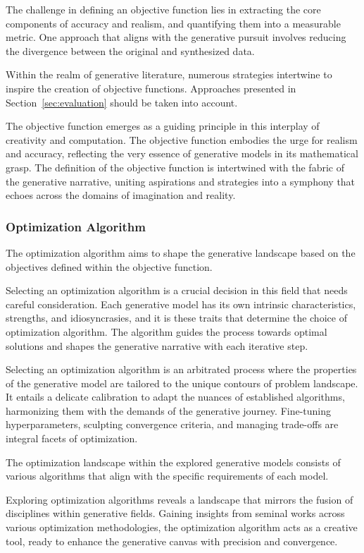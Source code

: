 The challenge in defining an objective function lies in extracting the core components of accuracy and realism, and quantifying them into a measurable metric. One approach that aligns with the generative pursuit involves reducing the divergence between the original and synthesized data.

Within the realm of generative literature, numerous strategies intertwine to inspire the creation of objective functions. Approaches presented in Section~\ref{sec:evaluation} should be taken into account.

The objective function emerges as a guiding principle in this interplay of creativity and computation. The objective function embodies the urge for realism and accuracy, reflecting the very essence of generative models in its mathematical grasp. The definition of the objective function is intertwined with the fabric of the generative narrative, uniting aspirations and strategies into a symphony that echoes across the domains of imagination and reality.

\subsubsection{Optimization Algorithm}

The optimization algorithm aims to shape the generative landscape based on the objectives defined within the objective function.

Selecting an optimization algorithm is a crucial decision in this field that needs careful consideration. Each generative model has its own intrinsic characteristics, strengths, and idiosyncrasies, and it is these traits that determine the choice of optimization algorithm. The algorithm guides the process towards optimal solutions and shapes the generative narrative with each iterative step.

Selecting an optimization algorithm is an arbitrated process where the properties of the generative model are tailored to the unique contours of problem landscape. It entails a delicate calibration to adapt the nuances of established algorithms, harmonizing them with the demands of the generative journey. Fine-tuning hyperparameters, sculpting convergence criteria, and managing trade-offs are integral facets of optimization.

The optimization landscape within the explored generative models consists of various algorithms that align with the specific requirements of each model.

Exploring optimization algorithms reveals a landscape that mirrors the fusion of disciplines within generative fields. Gaining insights from seminal works across various optimization methodologies, the optimization algorithm acts as a creative tool, ready to enhance the generative canvas with precision and convergence.

